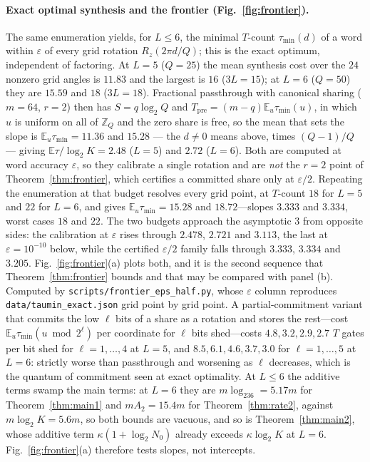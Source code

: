 \documentclass[aps,prx,twocolumn,superscriptaddress,nofootinbib,longbibliography]{revtex4-2}
\theoremstyle{plain}
\theoremstyle{definition}
\theoremstyle{remark}
\newcommand{\Tpre}{T_{\mathrm{pre}}}
\newcommand{\E}{\mathbb{E}}
\newcommand{\Z}{\mathbb{Z}}
\begin{document}
\paragraph{Exact optimal synthesis and the frontier (Fig.~\ref{fig:frontier}).} The same enumeration yields, for $L\le6$, the minimal $T$-count $\tau_{\min}(d)$ of a word within $\varepsilon$ of every grid rotation $R_z(2\pi d/Q)$; this is the exact optimum, independent of factoring. At $L=5$ ($Q=25$) the mean synthesis cost over the $24$ nonzero grid angles is $11.83$ and the largest is $16$ ($3L=15$); at $L=6$ ($Q=50$) they are $15.59$ and $18$ ($3L=18$). Fractional passthrough with canonical sharing ($m=64$, $r=2$) then has $S=q\log_2Q$ and $\Tpre=(m-q)\E_u\tau_{\min}(u)$, in which $u$ is uniform on all of $\Z_Q$ and the zero share is free, so the mean that sets the slope is $\E_u\tau_{\min}=11.36$ and $15.28$ --- the $d\ne0$ means above, times $(Q-1)/Q$ --- giving $\E\tau/\log_2K=2.48$ ($L=5$) and $2.72$ ($L=6$). Both are computed at word accuracy $\varepsilon$, so they calibrate a single rotation and are \emph{not} the $r=2$ point of Theorem~\ref{thm:frontier}, which certifies a committed share only at $\varepsilon/2$. Repeating the enumeration at that budget resolves every grid point, at $T$-count $18$ for $L=5$ and $22$ for $L=6$, and gives $\E_u\tau_{\min}=15.28$ and $18.72$---slopes $3.333$ and $3.334$, worst cases $18$ and $22$. The two budgets approach the asymptotic $3$ from opposite sides: the calibration at $\varepsilon$ rises through $2.478$, $2.721$ and $3.113$, the last at $\varepsilon=10^{-10}$ below, while the certified $\varepsilon/2$ family falls through $3.333$, $3.334$ and $3.205$. Fig.~\ref{fig:frontier}(a) plots both, and it is the second sequence that Theorem~\ref{thm:frontier} bounds and that may be compared with panel (b). Computed by \texttt{scripts/frontier\_eps\_half.py}, whose $\varepsilon$ column reproduces \texttt{data/taumin\_exact.json} grid point by grid point. A partial-commitment variant that commits the low $\ell$ bits of a share as a rotation and stores the rest---cost $\E_u\tau_{\min}(u\bmod2^\ell)$ per coordinate for $\ell$ bits shed---costs $4.8,3.2,2.9,2.7$ $T$ gates per bit shed for $\ell=1,\dots,4$ at $L=5$, and $8.5,6.1,4.6,3.7,3.0$ for $\ell=1,\dots,5$ at $L=6$: strictly worse than passthrough and worsening as $\ell$ decreases, which is the quantum of commitment seen at exact optimality. At $L\le6$ the additive terms swamp the main terms: at $L=6$ they are $m\log_236=5.17m$ for Theorem~\ref{thm:main1} and $mA_2=15.4m$ for Theorem~\ref{thm:rate2}, against $m\log_2K=5.6m$, so both bounds are vacuous, and so is Theorem~\ref{thm:main2}, whose additive term $\kappa(1+\log_2N_0)$ already exceeds $\kappa\log_2K$ at $L=6$. Fig.~\ref{fig:frontier}(a) therefore tests slopes, not intercepts.
\end{document}
